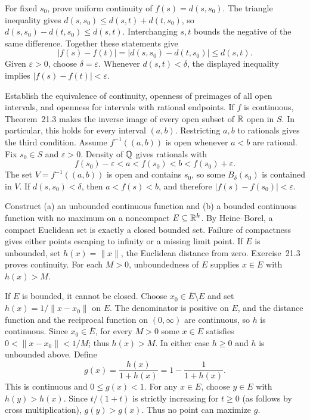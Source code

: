 \goal For fixed $s_0$, prove uniform continuity of $f(s)=d(s,s_0)$.
The triangle inequality gives
$d(s,s_0)\le d(s,t)+d(t,s_0)$, so
$d(s,s_0)-d(t,s_0)\le d(s,t)$. Interchanging $s,t$ bounds the negative
of the same difference. Together these statements give
\[
 |f(s)-f(t)|=|d(s,s_0)-d(t,s_0)|\le d(s,t).
\]
Given $\varepsilon>0$, choose $\delta=\varepsilon$. Whenever
$d(s,t)<\delta$, the displayed inequality implies
$|f(s)-f(t)|<\varepsilon$.

\goal Establish the equivalence of continuity, openness of preimages
of all open intervals, and openness for intervals with rational endpoints.
If $f$ is continuous, Theorem~21.3 makes the inverse image of every
open subset of $\mathbb{R}$ open in $S$. In particular, this holds for every
interval $(a,b)$. Restricting $a,b$ to rationals gives the third condition.
Assume $f^{-1}((a,b))$ is open whenever $a<b$ are rational. Fix
$s_0\in S$ and $\varepsilon>0$. Density of $\mathbb{Q}$ gives rationals with
\[
 f(s_0)-\varepsilon<a<f(s_0)<b<f(s_0)+\varepsilon.
\]
The set $V=f^{-1}((a,b))$ is open and contains $s_0$, so some
$B_\delta(s_0)$ is contained in $V$. If $d(s,s_0)<\delta$, then
$a<f(s)<b$, and therefore $|f(s)-f(s_0)|<\varepsilon$.

\goal Construct (a) an unbounded continuous function and (b) a bounded
continuous function with no maximum on a noncompact $E\subseteq\mathbb{R}^k$.
\idea By Heine--Borel, a compact Euclidean set is exactly a closed
bounded set. Failure of compactness gives either points escaping to
infinity or a missing limit point.
If $E$ is unbounded, set $h(x)=\|x\|$, the Euclidean distance from
zero. Exercise~21.3 proves continuity. For each $M>0$, unboundedness
of $E$ supplies $x\in E$ with $h(x)>M$.

If $E$ is bounded, it cannot be closed. Choose
$x_0\in\overline E\setminus E$ and set $h(x)=1/\|x-x_0\|$ on $E$.
The denominator is positive on $E$, and the distance function and the
reciprocal function on $(0,\infty)$ are continuous, so $h$ is continuous.
Since $x_0\in\overline E$, for every $M>0$ some $x\in E$ satisfies
$0<\|x-x_0\|<1/M$; thus $h(x)>M$.
In either case $h\ge0$ and $h$ is unbounded above. Define
\[
 g(x)=\frac{h(x)}{1+h(x)}=1-\frac1{1+h(x)}.
\]
This is continuous and $0\le g(x)<1$. For any $x\in E$, choose $y\in E$
with $h(y)>h(x)$. Since $t/(1+t)$ is strictly increasing for $t\ge0$
(as follows by cross multiplication), $g(y)>g(x)$. Thus no point
can maximize $g$.


